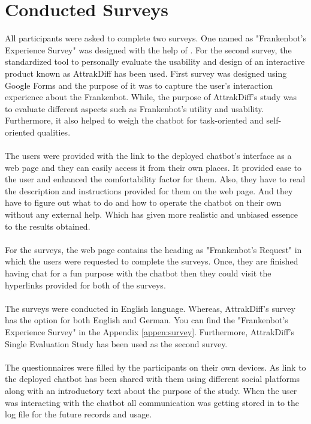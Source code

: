 \section{Conducted Surveys}
All participants were asked to complete two surveys. One named as "Frankenbot's Experience Survey" was designed with the help of \cite{MOLLER200726}\cite{itut}. For the second survey, the standardized tool to personally evaluate the usability and design of an interactive product known as AttrakDiff\cite{attrakdiff} has been used. First survey was designed using Google Forms and the purpose of it was to capture the user's interaction experience about the Frankenbot. While, the purpose of AttrakDiff's study was to evaluate different aspects such as Frankenbot's utility and usability. Furthermore, it also helped to weigh the chatbot for task-oriented and self-oriented qualities. 
\\~\\
The users were provided with the link to the deployed chatbot's interface as a web page and they can easily access it from their own places. It provided ease to the user and enhanced the comfortability factor for them. Also, they have to read the description and instructions provided for them on the web page. And they have to figure out what to do and how to operate the chatbot on their own without any external help. Which has given more realistic and unbiased essence to the results obtained.
\\~\\
For the surveys, the web page contains the heading as "Frankenbot's Request" in which the users were requested to complete the surveys. Once, they are finished having chat for a fun purpose with the chatbot then they could visit the hyperlinks provided for both of the surveys.
\\~\\
The surveys were conducted in English language. Whereas, AttrakDiff's survey has the option for both English and German. You can find the "Frankenbot's Experience Survey" in the Appendix \ref{appen:survey}. Furthermore, AttrakDiff's Single Evaluation Study\cite{indeval} has been used as the second survey.
\\~\\
The questionnaires were filled by the participants on their own devices. As link to the deployed chatbot has been shared with them using different social platforms along with an introductory text about the purpose of the study. When the user was interacting with the chatbot all communication was getting stored in to the log file for the future records and usage.

